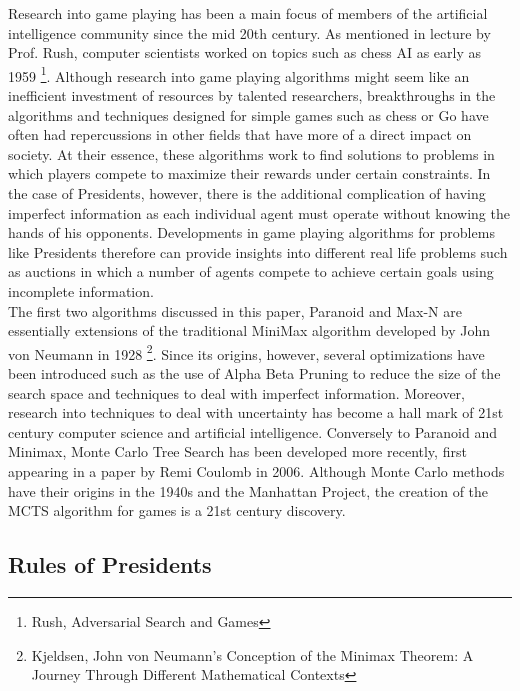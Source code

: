 \documentclass[11pt]{article}
\begin{document}
Research into game playing has been a main focus of members of the artificial intelligence community since the mid 20th century. As mentioned in lecture by Prof. Rush, computer scientists worked on topics such as chess AI as early as 1959 \footnote{Rush, Adversarial Search and Games}. Although research into game playing algorithms might seem like an inefficient investment of resources by talented researchers, breakthroughs in the algorithms and techniques designed for  simple games such as chess or Go have often had repercussions in other fields that have more of a direct impact on society. At their essence, these algorithms work to find solutions to problems in which players compete to maximize their rewards under certain constraints. In the case of Presidents, however, there is the additional complication of having imperfect information as each individual agent must operate without knowing the hands of his opponents. Developments in game playing algorithms for problems like Presidents therefore can provide insights into different real life problems such as auctions in which a number of agents compete to achieve certain goals using incomplete information.\\

The first two algorithms discussed in this paper, Paranoid and Max-N are essentially extensions of the traditional MiniMax algorithm developed by John von Neumann in 1928 \footnote{Kjeldsen, John von Neumann's Conception of the Minimax Theorem: A Journey Through Different Mathematical Contexts}. Since its origins, however, several optimizations have been introduced such as the use of Alpha Beta Pruning to reduce the size of the search space and techniques to deal with imperfect information. Moreover, research into techniques to deal with uncertainty has become a hall mark of 21st century computer science and artificial intelligence. Conversely to Paranoid and Minimax, Monte Carlo Tree Search has been developed more recently, first appearing in a paper by Remi Coulomb in 2006. Although Monte Carlo methods have their origins in the 1940s and the Manhattan Project, the creation of the MCTS algorithm for games is a 21st century discovery.


\subsection{Rules of Presidents}
\end{document}
